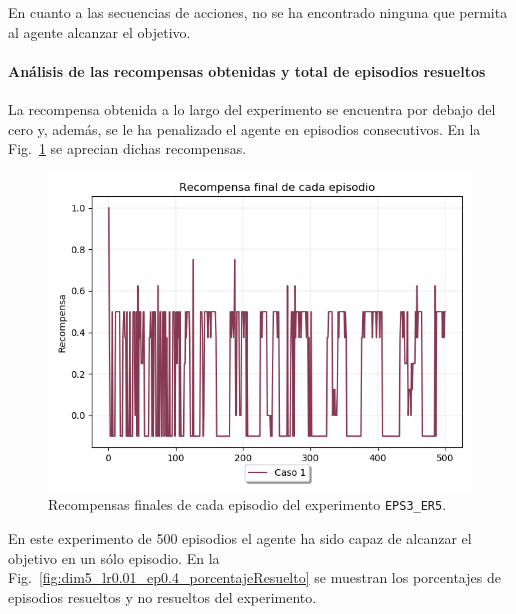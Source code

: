 En cuanto a las secuencias de acciones, no se ha encontrado ninguna que permita al agente alcanzar el objetivo. 

\paragraph{Análisis de las recompensas obtenidas y total de episodios resueltos} 

La recompensa obtenida a lo largo del experimento se encuentra por debajo del cero y, además, se le ha penalizado el agente en episodios consecutivos. En la Fig.~\ref{fig:dim5_lr0.01_ep0.4_recompensa} se aprecian dichas recompensas. \\

\begin{figure}
    \centering
    \includegraphics[scale=0.4]{cap5_experimentacion/images/dim5_lr0.01_ep0.4_recompensa.png}
    \caption{Recompensas finales de cada episodio del experimento \texttt{EPS3\_ER5}.}
    \label{fig:dim5_lr0.01_ep0.4_recompensa}
\end{figure}

En este experimento de 500 episodios el agente ha sido capaz de alcanzar el objetivo en un sólo episodio. En la Fig.~\ref{fig:dim5_lr0.01_ep0.4_porcentajeResuelto} se muestran los porcentajes de episodios resueltos y no resueltos del experimento. 

